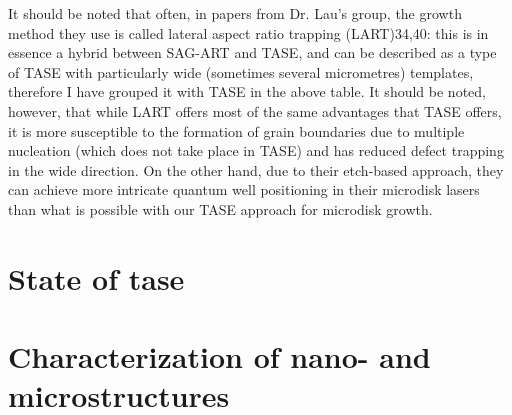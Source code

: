 It should be noted that often, in papers from Dr. Lau’s group, the growth method they use is called lateral aspect ratio trapping (LART)34,40: this is in essence a hybrid between SAG-ART and TASE, and can be described as a type of TASE with particularly wide (sometimes several micrometres) templates, therefore I have grouped it with TASE in the above table. It should be noted, however, that while LART offers most of the same advantages that TASE offers, it is more susceptible to the formation of grain boundaries due to multiple nucleation (which does not take place in TASE) and has reduced defect trapping in the wide direction. On the other hand, due to their etch-based approach, they can achieve more intricate quantum well positioning in their microdisk lasers than what is possible with our TASE approach for microdisk growth.

\section{\texorpdfstring{State of \acl{tase}}{State of template assisted selective epitaxy}}
\section{Characterization of nano- and microstructures}